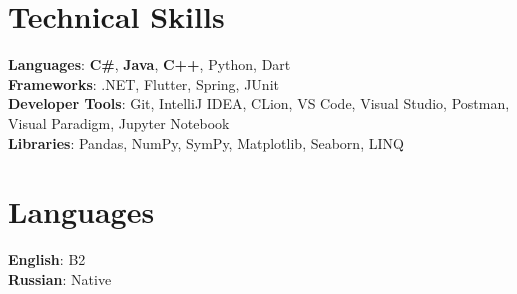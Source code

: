 \documentclass[letterpaper,11pt]{article}
\begin{document}

%
\section{Technical Skills}
 \begin{itemize}[leftmargin=0.15in, label={}]
    \small{\item{
     \textbf{Languages}{: \textbf{C\#}, \textbf{Java}, \textbf{C++}, Python, Dart} \\
     \textbf{Frameworks}{: .NET, Flutter, Spring, JUnit} \\
     \textbf{Developer Tools}{: Git, IntelliJ IDEA, CLion, VS Code, Visual Studio, Postman, Visual Paradigm, Jupyter Notebook} \\
     \textbf{Libraries}{: Pandas, NumPy, SymPy, Matplotlib, Seaborn, LINQ}
    }}
 \end{itemize}

\section{Languages}
 \begin{itemize}[leftmargin=0.15in, label={}]
    \small{\item{
     \textbf{English}{: B2} \\
     \textbf{Russian}{: Native}
    }}
 \end{itemize}

\end{document}
